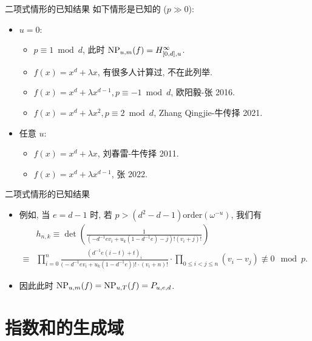 \documentclass[aspectratio=169,handout]{ctexbeamer}
\begin{document}
\begin{frame}{二项式情形的已知结果}
	如下情形是已知的 ($p\gg0$):
	\begin{itemize}
		\item $u=0$:
		\begin{itemize}
			\item $p\equiv 1\bmod d$, 此时 ${\mathrm{NP}}_{u,m}(f)=H_{[0,d],u}^\infty$.
			\item $f(x)=x^d+\lambda x$, 有很多人计算过, 不在此列举.
			\item $f(x)=x^d+\lambda x^{d-1},p\equiv -1\bmod d$, 欧阳毅-张 2016.
			\item $f(x)=x^d+\lambda x^2,p\equiv 2\bmod d$, Zhang Qingjie-牛传择 2021.
		\end{itemize}
		\item 任意 $u$:
		\begin{itemize}
			\item $f(x)=x^d+\lambda x$, 刘春雷-牛传择 2011.
			\item $f(x)=x^d+\lambda x^{d-1}$, 张 2022.
		\end{itemize}
	\end{itemize}
\end{frame}


\begin{frame}{二项式情形的已知结果}
	\begin{itemize}
		\item 例如, 当 $e=d-1$ 时, 若 $p>(d^2-d-1)\mathrm{order}(\omega^{-u})$, 我们有
		\[
			\begin{split}
				&h_{n,k}\equiv\det\left(\frac{1}{(-d^{-1}ev_i+u_k(1-d^{-1}e)-j)!(v_i+j)!}\right)\\
				\equiv &\prod_{i=0}^n \frac{\left(d^{-1}e(i-t)+t\right)_i}{\bigl(-d^{-1}ev_i+u_k(1-d^{-1}e)\bigr)!\cdot(v_i+n)!} \cdot \prod_{0\le i<j\le n}(v_i-v_j)\not\equiv 0\mod p.
			\end{split}
		\]
		\item 因此此时 ${\mathrm{NP}}_{u,m}(f)={\mathrm{NP}}_{u,T}(f)=P_{u,e,d}$.
	\end{itemize}
\end{frame}


\section{指数和的生成域}
\end{document}

